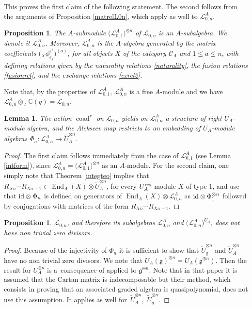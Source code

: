 \documentclass[pdftex]{sigma}%
\numberwithin{equation}{section}
\numberwithin{figure}{section}
\newtheorem{lem}[teo]{Lemma}
\newtheorem{prop}[teo]{Proposition}
\newcommand{\Ll}{{\mathcal L}}
\newcommand{\ra}{\rightarrow}
\begin{document}
This proves the first claim of the following statement. The second follows from the arguments of Proposition \ref{matrelL0n}, which apply as well to $\Ll_{0,n}^A$.
\begin{prop}\label{defiL0nA} The $A$-submodule $\big(\Ll_{0,1}^A\big)^{\otimes n}$ of $\Ll_{0,n}$ is an $A$-subalgebra. We denote it $\Ll_{0,n}^A$. Moreover, $\Ll_{0,n}^A$ is the $A$-algebra generated by the matrix coefficients $\big({}_X\phi^{e^i}_{e_j}\big)^{(a)}$, for all objects $X$ of the category $\mathcal{C}_A$ and $1\leq a \leq n$, with defining relations given by the naturality relations \eqref{naturality}, the fusion relations \eqref{fusionrel}, and the exchange relations \eqref{exrel2}.
\end{prop}
Note that, by the properties of $\Ll_{0,1}^A$, $\Ll_{0,n}^A$ is a free $A$-module and we have $\Ll_{0,n}^A\otimes_A {\mathbb C}(q)=\Ll_{0,n}$.
\begin{lem}\label{intform-n} The action $\operatorname{coad}^r$ on $\Ll_{0,n}$ yields on $\Ll_{0,n}^A$ a structure of right $U_A$-module algebra, and the Alekseev map restricts to an embedding of $U_A$-module algebras $\Phi_n\colon \Ll_{0,n}^A\ra \tilde{U}_A^{\otimes n}$.
\end{lem}
\begin{proof} The first claim follows immediately from the case of $\Ll_{0,1}^A$ (see Lemma \ref{intform}), since $\Ll_{0,n}^A = \big(\Ll_{0,1}^A\big)^{\otimes n}$ as an $A$-module. For the second claim, one simply note that Theorem \ref{integteo} implies that $R_{Xn}\cdots R_{Xa+1} \in \operatorname{End}_A(X) \otimes \tilde{U}_A^{\otimes n}$, for every $U_A^{\rm res}$-module $X$ of type $1$, and use that ${\rm id} \otimes\Phi_n$ is defined on generators of $\operatorname{End}_A(X) \otimes \Ll_{0,n}^A$ as ${\rm id} \otimes \Phi_1^{\otimes n}$ followed by conjugations with matrices of the form $R_{Xn}\cdots R_{Xa+1}$.\end{proof}

\begin{prop}\label{nozeroq}
$\Ll_{0,n}$, and therefore its subalgebras $\Ll_{0,n}^A$ and $\big(\Ll_{0,n}^A\big)^{U_A}$, does not have non trivial zero divisors.
\end{prop}
\begin{proof} Because of the injectivity of $\Phi_n$ it is sufficient to show that $\tilde{U}_q^{\otimes n}$ and $\tilde{U}_A^{\otimes n}$ have no non trivial zero divisors. We note that $U_A(\mathfrak{g})^{\otimes n}=U_A(\mathfrak{g}^{\oplus n}).$ Then the result for ${U}_A^{\otimes n}$ is a~consequence of \cite[Corollary 1.8]{DC-K} applied to $\mathfrak{g}^{\oplus n}.$ Note that in that paper it is assumed that the Cartan matrix is indecomposable but their method, which consists in proving that an associated graded algebra is quasipolynomial, does not use this assumption. It applies as well for~$\tilde{U}_A^{\otimes n}$,~$\tilde{U}_q^{\otimes n}$. \end{proof}
\end{document}
